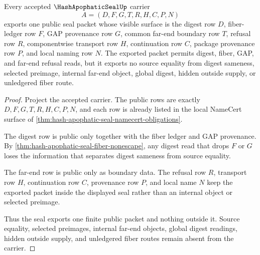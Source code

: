\begin{theorem}
\label{thm:hash-apophatic-seal-public-seal-export}
Every accepted $\HashApophaticSealUp$ carrier
$$
A=(D,F,G,T,R,H,C,P,N)
$$
exports one public seal packet whose visible surface is the digest row $D$, fiber-ledger row $F$, GAP provenance row $G$, common far-end boundary row $T$, refusal row $R$, componentwise transport row $H$, continuation row $C$, package provenance row $P$, and local naming row $N$. The exported packet permits digest, fiber, GAP, and far-end refusal reads, but it exports no source equality from digest sameness, selected preimage, internal far-end object, global digest, hidden outside supply, or unledgered fiber route.
\end{theorem}
\begin{proof}
Project the accepted carrier. The public rows are exactly $D,F,G,T,R,H,C,P,N$, and each row is already listed in the local NameCert surface of \autoref{thm:hash-apophatic-seal-namecert-obligations}.

The digest row is public only together with the fiber ledger and GAP provenance. By \autoref{thm:hash-apophatic-seal-fiber-nonescape}, any digest read that drops $F$ or $G$ loses the information that separates digest sameness from source equality.

The far-end row is public only as boundary data. The refusal row $R$, transport row $H$, continuation row $C$, provenance row $P$, and local name $N$ keep the exported packet inside the displayed seal rather than an internal object or selected preimage.

Thus the seal exports one finite public packet and nothing outside it. Source equality, selected preimages, internal far-end objects, global digest readings, hidden outside supply, and unledgered fiber routes remain absent from the carrier.
\end{proof}

